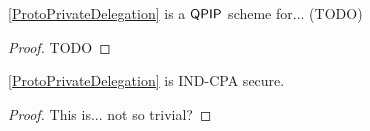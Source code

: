 \begin{thm}
	\autoref{ProtoPrivateDelegation} is a $\operatorname{\mathsf{QPIP}}$ scheme for... (TODO) 
\end{thm}
\begin{proof}
	TODO
\end{proof}

\begin{thm}
	\autoref{ProtoPrivateDelegation} is IND-CPA secure.
\end{thm}
\begin{proof}
	This is... not so trivial?
\end{proof}
